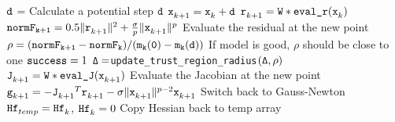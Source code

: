 \begin{algorithm}
\begin{algorithmic}[1]
    \EndIf
    \EndIf
        \State ${\td}$ = 
        \Comment Calculate a potential step $\td$
        \State $\iter[k+1]{\tx} = \iter[k]{\tx} + \td$
        \State $\iter[k+1]{\tr} = {\tt W * \text{\tt eval\_r}}(\iter[k]{\tx})$
        \State ${\tt normF_{k+1}}  = 0.5\|\iter[k+1]{\tr}\|^2 + \frac{\sigma}{p} \|\iter[k+1]{\tx}\|^p$
        \Comment Evaluate the residual at the new point
        \State $\rho = \tt (normF_{k+1} - normF_k)/(m_k(0) - m_k(\td)) $ 
        \Comment If model is good, $\rho$ should be close to one
          \State ${\tt success} = 1$
        \EndIf
        \State ${\tt \Delta = }${\tt update\_trust\_region\_radius}${\tt (\Delta,\rho)}$
      \EndWhile
      \State $\iter[k+1]{\tJ} = {\tt W * \text{\tt eval\_J}}(\iter[k+1]{\tx})$
      \Comment Evaluate the Jacobian at the new point
      \State $\iter[k+1]{\tg} = -{\iter[k+1]{\tJ}}^T\iter[k+1]{\tr}- \sigma \|\iter[k+1]{\tx}\|^{p-2}\iter[k+1]{\tx}$
          \If { $\|\iter[k+1]{\tg}\| > \|\iter[k]{\tg} \| $}
          \Comment Switch back to Gauss-Newton
          \State ${\iter[temp]{\thess}} = \iter[k]{\thess}$, $\iter[k]{\thess} = 0$
          \Comment Copy Hessian back to temp array
          \EndIf
        \Else
  \end{algorithmic}
  
\end{algorithm}

